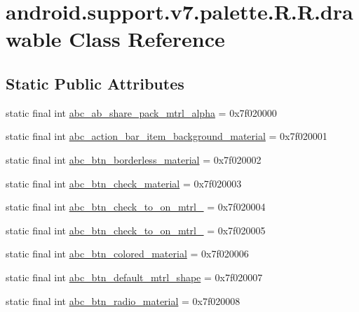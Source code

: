 \hypertarget{classandroid_1_1support_1_1v7_1_1palette_1_1_r_1_1drawable}{
\section{android.support.v7.palette.R.R.drawable Class Reference}
\label{classandroid_1_1support_1_1v7_1_1palette_1_1_r_1_1drawable}
}
\subsection*{Static Public Attributes}
\begin{CompactItemize}
\item 
static final int \hyperlink{classandroid_1_1support_1_1v7_1_1palette_1_1_r_1_1drawable_31203deedd57b4f13f6de0c9e7673786}{abc\_\-ab\_\-share\_\-pack\_\-mtrl\_\-alpha} = 0x7f020000
\item 
static final int \hyperlink{classandroid_1_1support_1_1v7_1_1palette_1_1_r_1_1drawable_2ab1e84a5a33dcf33bfed5123a3e82dd}{abc\_\-action\_\-bar\_\-item\_\-background\_\-material} = 0x7f020001
\item 
static final int \hyperlink{classandroid_1_1support_1_1v7_1_1palette_1_1_r_1_1drawable_2ca5d12558600f1923280bad7e7806a1}{abc\_\-btn\_\-borderless\_\-material} = 0x7f020002
\item 
static final int \hyperlink{classandroid_1_1support_1_1v7_1_1palette_1_1_r_1_1drawable_d7e9f1e85a56a871e2585ca397c118b5}{abc\_\-btn\_\-check\_\-material} = 0x7f020003
\item 
static final int \hyperlink{classandroid_1_1support_1_1v7_1_1palette_1_1_r_1_1drawable_fb46476c5a1be6faa6598f5d38526578}{abc\_\-btn\_\-check\_\-to\_\-on\_\-mtrl\_} = 0x7f020004
\item 
static final int \hyperlink{classandroid_1_1support_1_1v7_1_1palette_1_1_r_1_1drawable_dd1ca20700e6a7ee7ead692a74a289b8}{abc\_\-btn\_\-check\_\-to\_\-on\_\-mtrl\_} = 0x7f020005
\item 
static final int \hyperlink{classandroid_1_1support_1_1v7_1_1palette_1_1_r_1_1drawable_fcabf03546045127ee21114f4e906c40}{abc\_\-btn\_\-colored\_\-material} = 0x7f020006
\item 
static final int \hyperlink{classandroid_1_1support_1_1v7_1_1palette_1_1_r_1_1drawable_e326507d3053695a83bdf5ce5298db72}{abc\_\-btn\_\-default\_\-mtrl\_\-shape} = 0x7f020007
\item 
static final int \hyperlink{classandroid_1_1support_1_1v7_1_1palette_1_1_r_1_1drawable_c262a10e96b9a481b0d53051561c6338}{abc\_\-btn\_\-radio\_\-material} = 0x7f020008

\end{CompactItemize}

